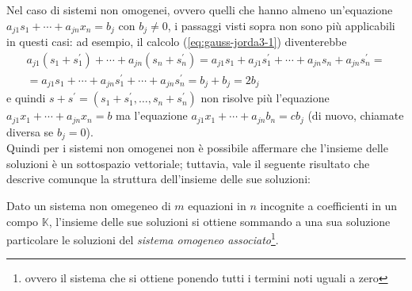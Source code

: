 Nel caso di sistemi non omogenei, ovvero quelli che hanno almeno
un'equazione $a_{j1}s_1+\cdots+a_{jn}x_n=b_j$ con $b_j\neq 0$, i passaggi
visti sopra non sono più applicabili in questi casi: ad esempio, il
calcolo (\ref{eq:gauss-jorda3-1}) diventerebbe
\begin{equation*}
  \begin{matrix}
    a_{j1}(s_1+s_1^\prime)+\cdots+a_{jn}(s_n+s_n^\prime)=a_{j1}s_1+a_{j1}
    s_1^\prime+\cdots+a_{jn}s_n+a_{jn}s_n^\prime=\\
    =a_{j1}s_1+\cdots+a_{jn}s_1^\prime+\cdots+a_{jn}s_n^\prime=b_j+b_j=2b_j
  \end{matrix}
\end{equation*}
e quindi $s+s^\prime=(s_1+s_1^\prime,\dots, s_n+s_n^\prime)$ non risolve più
l'equazione $a_{j1}x_1+\cdots+a_{jn}x_n=b$ ma l'equazione $a_{j1}x_1+\cdots
+a_{jn}b_n=cb_j$ (di nuovo, chiamate diversa se $b_j=0$).\\
Quindi per i sistemi non omogenei non è possibile affermare che l'insieme
delle soluzioni è un sottospazio vettoriale; tuttavia, vale il seguente
risultato che descrive comunque la struttura dell'insieme delle sue
soluzioni:
\begin{prop}
  \label{prop:gauss-jorda4}
  Dato un sistema non omegeneo di $m$ equazioni in $n$ incognite a
  coefficienti in un compo $\mathds{K}$, l'insieme delle sue soluzioni
  si ottiene sommando a una sua soluzione particolare le soluzioni del
  \textit{sistema omogeneo associato}\footnote{ovvero il sistema che si
  ottiene ponendo tutti i termini noti uguali a zero}.
\end{prop}
